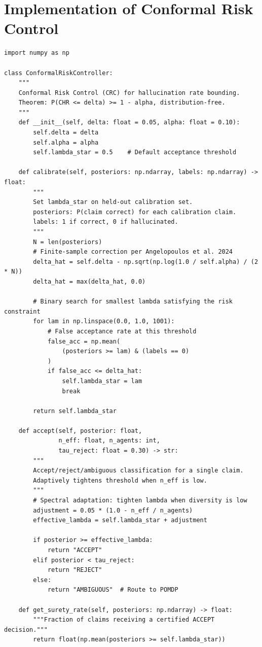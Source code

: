 \documentclass[12pt,a4paper]{report}
\begin{document}
\section{Implementation of Conformal Risk Control}

\begin{lstlisting}[caption={CRC Threshold Calibration and Runtime Acceptance},
                   label={lst:crc}]
import numpy as np

class ConformalRiskController:
    """
    Conformal Risk Control (CRC) for hallucination rate bounding.
    Theorem: P(CHR <= delta) >= 1 - alpha, distribution-free.
    """
    def __init__(self, delta: float = 0.05, alpha: float = 0.10):
        self.delta = delta
        self.alpha = alpha
        self.lambda_star = 0.5    # Default acceptance threshold

    def calibrate(self, posteriors: np.ndarray, labels: np.ndarray) -> float:
        """
        Set lambda_star on held-out calibration set.
        posteriors: P(claim correct) for each calibration claim.
        labels: 1 if correct, 0 if hallucinated.
        """
        N = len(posteriors)
        # Finite-sample correction per Angelopoulos et al. 2024
        delta_hat = self.delta - np.sqrt(np.log(1.0 / self.alpha) / (2 * N))
        delta_hat = max(delta_hat, 0.0)

        # Binary search for smallest lambda satisfying the risk constraint
        for lam in np.linspace(0.0, 1.0, 1001):
            # False acceptance rate at this threshold
            false_acc = np.mean(
                (posteriors >= lam) & (labels == 0)
            )
            if false_acc <= delta_hat:
                self.lambda_star = lam
                break

        return self.lambda_star

    def accept(self, posterior: float,
               n_eff: float, n_agents: int,
               tau_reject: float = 0.30) -> str:
        """
        Accept/reject/ambiguous classification for a single claim.
        Adaptively tightens threshold when n_eff is low.
        """
        # Spectral adaptation: tighten lambda when diversity is low
        adjustment = 0.05 * (1.0 - n_eff / n_agents)
        effective_lambda = self.lambda_star + adjustment

        if posterior >= effective_lambda:
            return "ACCEPT"
        elif posterior < tau_reject:
            return "REJECT"
        else:
            return "AMBIGUOUS"  # Route to POMDP

    def get_surety_rate(self, posteriors: np.ndarray) -> float:
        """Fraction of claims receiving a certified ACCEPT decision."""
        return float(np.mean(posteriors >= self.lambda_star))
\end{lstlisting}
\end{document}
